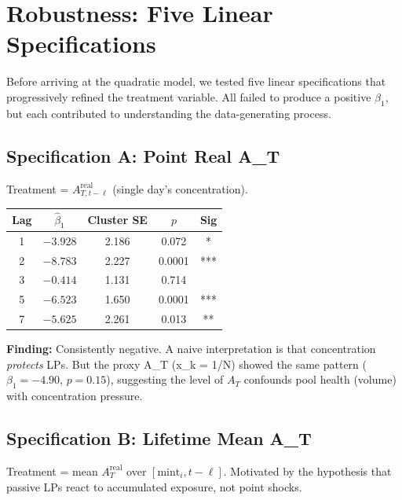 \documentclass[11pt,a4paper]{article}
\begin{document}
\section{Robustness: Five Linear Specifications}\label{sec:robustness}

Before arriving at the quadratic model, we tested five linear specifications
that progressively refined the treatment variable. All failed to produce a
positive $\beta_1$, but each contributed to understanding the data-generating
process.

\subsection{Specification A: Point Real A\_T}

Treatment = $A_{T,t-\ell}^{\text{real}}$ (single day's concentration).

\begin{center}
\begin{tabular}{ccccc}
\toprule
Lag & $\hat\beta_1$ & Cluster SE & $p$ & Sig \\
\midrule
1 & $-3.928$ & 2.186 & 0.072 & * \\
2 & $-8.783$ & 2.227 & 0.0001 & *** \\
3 & $-0.414$ & 1.131 & 0.714 & \\
5 & $-6.523$ & 1.650 & 0.0001 & *** \\
7 & $-5.625$ & 2.261 & 0.013 & ** \\
\bottomrule
\end{tabular}
\end{center}

\textbf{Finding:} Consistently negative. A naive interpretation is that
concentration \emph{protects} LPs. But the proxy A\_T (x\_k = 1/N) showed the
same pattern ($\beta_1 = -4.90$, $p = 0.15$), suggesting the level of
$A_T$ confounds pool health (volume) with concentration pressure.

\subsection{Specification B: Lifetime Mean A\_T}

Treatment = mean $A_T^{\text{real}}$ over $[\text{mint}_i, t - \ell]$.
Motivated by the hypothesis that passive LPs react to accumulated exposure,
not point shocks.
\end{document}
